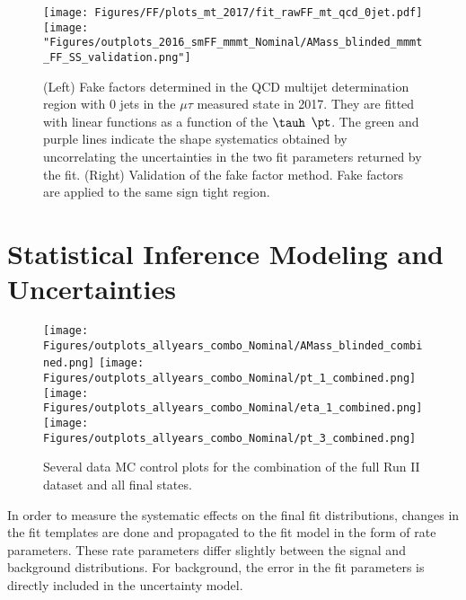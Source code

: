 \begin{figure}[ht!b]
\centering
\texttt{[image: Figures/FF/plots\_mt\_2017/fit\_rawFF\_mt\_qcd\_0jet.pdf]}
\texttt{[image: "Figures/outplots\_2016\_smFF\_mmmt\_Nominal/AMass\_blinded\_mmmt\_FF\_SS\_validation.png"]}
\caption{\label{fig:fakefactor_validation} (Left) Fake factors determined in the QCD multijet determination region with 0 jets in the $\mu\tau$ measured state in 2017. They are fitted with linear functions as a function of the $\tauh$ $\pt$. The green and purple lines indicate the shape systematics obtained by uncorrelating the uncertainties in the two fit parameters returned by the fit.  
(Right) Validation of the fake factor method. Fake factors are applied to the same sign tight region.}
\end{figure}

  

\section{Statistical Inference Modeling and Uncertainties}

\begin{figure}[ht!b]
  \centering
  \texttt{[image: Figures/outplots\_allyears\_combo\_Nominal/AMass\_blinded\_combined.png]}
  \texttt{[image: Figures/outplots\_allyears\_combo\_Nominal/pt\_1\_combined.png]}\\
  \texttt{[image: Figures/outplots\_allyears\_combo\_Nominal/eta\_1\_combined.png]}
  \texttt{[image: Figures/outplots\_allyears\_combo\_Nominal/pt\_3\_combined.png]}\\
    \caption{\label{fig:AMass_RunII}  Several data MC control plots for the combination of the full Run II dataset and all final states.}
\end{figure}


In order to measure the systematic effects on the final fit distributions, changes in the fit templates are done and propagated to the fit model in the form of rate parameters. These rate parameters differ slightly between the signal and background distributions. 
For background, the error in the fit parameters is directly included in the uncertainty model. 

